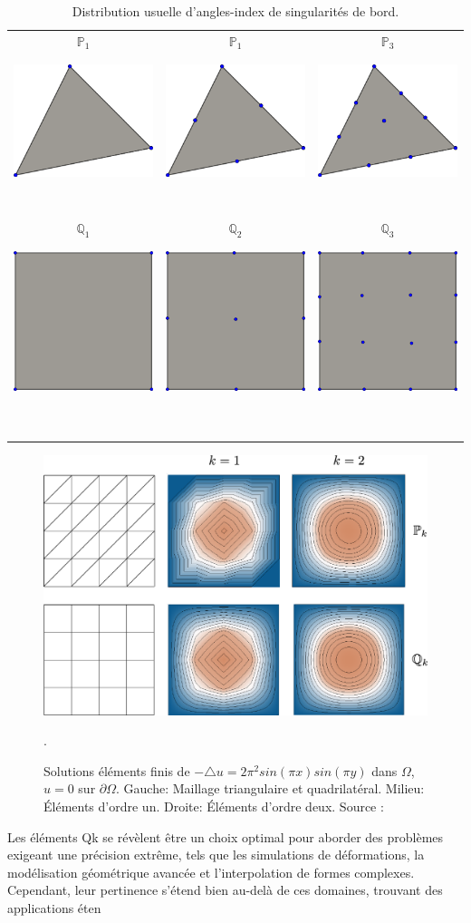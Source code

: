\begin{table}[!h]
\centering
\begin{tabular}{|c|c|c|}
\hline
\multirow{2}{*}{$\mathbb{P}_1$} & \multirow{2}{*}{$\mathbb{P}_1$} & \multirow{2}{*}{$\mathbb{P}_3$} \\
&&\\
\hline
&&\\
&&\\
\multirow{2}{*}{\includegraphics[scale=0.25]{images/P1.pdf}}   & \multirow{2}{*}{\includegraphics[scale=0.25]{images/P2.pdf}}   & \multirow{2}{*}{\includegraphics[scale=0.25]{images/P3.pdf}}   \\
&                          &                            \\
&&\\
&&\\
&&\\
&&\\
&&\\
&&\\
&&\\
\hline
\multirow{2}{*}{$\mathbb{Q}_1$} & \multirow{2}{*}{$\mathbb{Q}_2$}   & \multirow{2}{*}{$\mathbb{Q}_3$} \\
&&\\
\hline
&&\\
&&\\
\multirow{2}{*}{\includegraphics[scale=0.2]{images/Q1.pdf}}   & \multirow{2}{*}{\includegraphics[scale=0.2]{images/Q2.pdf}}   & \multirow{2}{*}{\includegraphics[scale=0.2]{images/Q3.pdf}}   \\
&&\\
&&\\
&&\\
&&\\
&&\\
&&\\
&&\\
&&\\
&&\\
&&\\
\hline
\end{tabular}
\caption{Distribution usuelle d'angles-index de singularités de bord.}
\label{tabul}
\end{table}

\begin{figure}
    \centering
    \includegraphics[scale=0.5]{images/comparaison_P_1_P_2.png}
    \caption{Solutions éléments finis de $-\triangle u=2\pi^2sin(\pi x)sin(\pi y)$ dans $\Omega$, $u=0$ sur $\partial\Omega$. Gauche: Maillage triangulaire et quadrilatéral. Milieu: Éléments d’ordre un. Droite: Éléments d’ordre deux. Source : \cite{reberol2018maillages}}.
    \label{fig:p1_vs_p2}
\end{figure}

Les éléments Qk se révèlent être un choix optimal pour aborder des problèmes exigeant une précision extrême, tels que les simulations de déformations, la modélisation géométrique avancée et l'interpolation de formes complexes. Cependant, leur pertinence s'étend bien au-delà de ces domaines, trouvant des applications éten